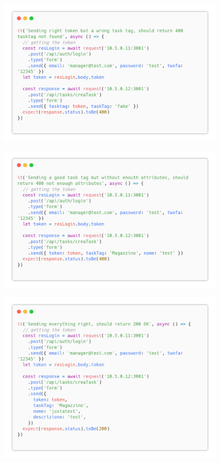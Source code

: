 \documentclass{report}
\begin{document}
\begin{figure}[H]
	\centering\includegraphics[width=1\textwidth]{images/code_crea_task_test4.png}
\end{figure}
\begin{figure}[H]
	\centering\includegraphics[width=1\textwidth]{images/code_crea_task_test5.png}
\end{figure}
\begin{figure}[H]
	\centering\includegraphics[width=1\textwidth]{images/code_crea_task_test6.png}
\end{figure}
\end{document}
